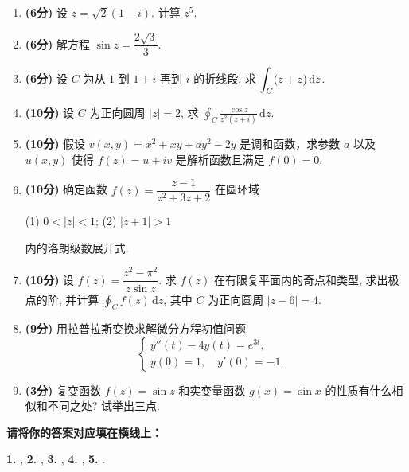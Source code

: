 \documentclass[simple]{hfutexam}
\newcommand{\diff}{\,\mathrm{d}}
\let\Im\relax\DeclareMathOperator{\Im}{Im}
\let\Re\relax\DeclareMathOperator{\Re}{Re}
\begin{document}
\begin{enumerate}
\item \textbf{(6分)} 设 $z=\sqrt2(1-i)$. 计算 $z^5$.
\item \textbf{(6分)} 解方程 $\sin z=\dfrac{2\sqrt3}3$.
\item \textbf{(6分)} 设 $C$ 为从 $1$ 到 $1+i$ 再到 $i$ 的折线段, 求 $\displaystyle\int_C (\Re z+\Im z) \diff z$.
\item \textbf{(10分)} 设 $C$ 为正向圆周 $|z|=2$, 求 $\displaystyle\oint_C\frac{\cos z}{z^2(z+i)}\diff z$.
\item \textbf{(10分)} 假设 $v(x,y)=x^2+xy+ay^2-2y$ 是调和函数，求参数 $a$ 以及 $u(x,y)$ 使得 $f(z)=u+iv$ 是解析函数且满足 $f(0)=0$.
\item \textbf{(10分)} 确定函数 $f(z)=\dfrac{z-1}{z^2+3z+2}$ 在圆环域\par
(1) $0<|z|<1$; \hspace{2em} (2) $|z+1|>1$\par
内的洛朗级数展开式.
\item \textbf{(10分)} 设 $f(z)=\dfrac{z^2-\pi^2}{z\sin z}$. 求 $f(z)$ 在有限复平面内的奇点和类型, 求出极点的阶, 并计算 $\displaystyle\oint_{C}f(z)\diff z$, 其中 $C$ 为正向圆周 $|z-6|=4$.
\item \textbf{(9分)} 用拉普拉斯变换求解微分方程初值问题
\[\begin{cases}
y''(t)-4y(t)=e^{3t},&\\
y(0)=1,\quad y'(0)=-1.
\end{cases}\]
\item \textbf{(3分)} 复变函数 $f(z)=\sin z$ 和实变量函数 $g(x)=\sin x$ 的性质有什么相似和不同之处? 试举出三点.
\end{enumerate}

\ZhuanYeBanJi{}
\maketitle


\textbf{请将你的答案对应填在横线上：}

\textbf{1.} , 
\textbf{2.} , 
\textbf{3.} , 
\textbf{4.} , 
\textbf{5.} \fillblank[4.5cm]{$-4\pi\delta(\omega)$}.
\end{document}
